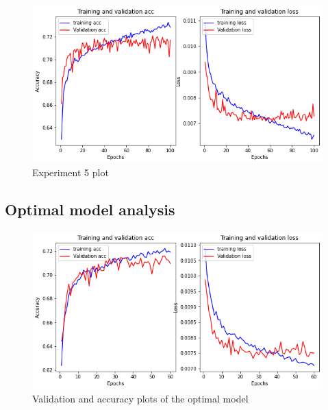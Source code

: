 \begin{figure}[H]
    \centering
    \includegraphics[width=0.7\columnwidth]{sections/figures/Experiment5.png}
    \caption{Experiment 5 plot}
    \label{fig:my_label}
\end{figure}

\subsection*{Optimal model analysis}
\begin{figure}[H]
    \centering
    \includegraphics[width=1\columnwidth]{sections/figures/optimal.png}
    \caption{Validation and accuracy plots of the optimal model}
    \label{fig:my_label}
\end{figure}

